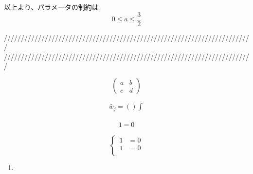 \documentclass[dvipdfmx]{report} %
\begin{document}
以上より、パラメータの制約は
\[ 0 \leq a \leq \frac{3}{2} \]

\newpage




\noindent
/////////////////////////////////////////////////////////////////////////\\
/////////////////////////////////////////////////////////////////////////

\begin{equation*}
\begin{pmatrix}
   a & b \\
   c & d
\end{pmatrix}
\end{equation*}

\begin{equation*}
\begin{split}
	\bar{w}_j = \left( \right) \int^{}_{}
\end{split}
\end{equation*}

\begin{tcolorbox}[title=メモ用]
\begin{eqnarray*}
	1 = 0
\end{eqnarray*}
\end{tcolorbox}

\begin{equation}
\left\{ \,
\begin{aligned}
	1 &= 0\\
	1 &= 0\\
\end{aligned}
\right.
\end{equation}


\begin{enumerate}[(1)\,]
\item{}
\end{enumerate}
\end{document}
